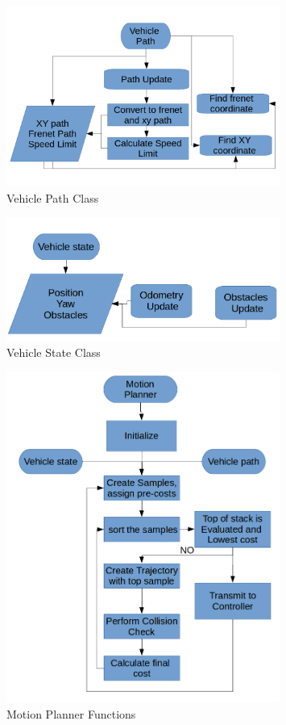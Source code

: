 \begin{figure}
	\centering
	\includegraphics[width=0.8\textwidth]{Images/implementation/vehicle_path.png}
	\caption{Vehicle Path Class}
	\label{vehicle_path_class}
\end{figure}

\begin{figure}
	\centering
	\includegraphics[width=0.8\textwidth]{Images/implementation/vehicle_state.png}
	\caption{Vehicle State Class}
	\label{vehicle_state_class}
\end{figure}

\begin{figure}
	\centering
	\includegraphics[width=0.8\textwidth]{Images/implementation/motion_planner.png}
	\caption{Motion Planner Functions}
	\label{motion_planner_class}
\end{figure}






